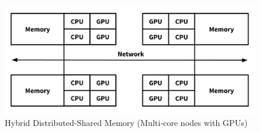 \begin{figure}[ht]
  \centering
  \includegraphics[scale=0.35]{images/hybrid_mem2.png}
  \caption{Hybrid Distributed-Shared Memory (Multi-core nodes with GPUs)}
  \label{fig:hybridd_mem2}
\end{figure}


